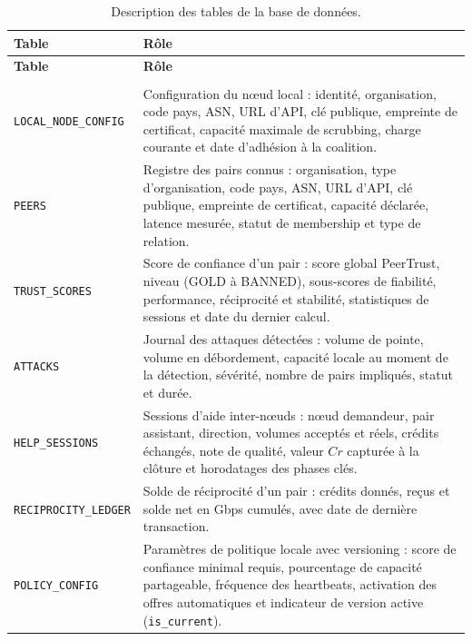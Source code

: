 \begin{longtable}{|
>{\raggedright\arraybackslash}p{5.2cm}|
>{\raggedright\arraybackslash}p{10.2cm}|}
\caption{Description des tables de la base de données.}
\label{tab:tables}
\\
\hline
\textbf{Table} & \textbf{Rôle} \\
\hline
\endfirsthead

\hline
\textbf{Table} & \textbf{Rôle} \\
\hline
\endhead

\hline
\multicolumn{2}{r}{\textit{Suite à la page suivante}} \\
\endfoot

\hline
\endlastfoot

\texttt{LOCAL\_NODE\_CONFIG} &
Configuration du nœud local : identité, organisation, code pays, ASN, URL d'API, clé publique, empreinte de certificat, capacité maximale de scrubbing, charge courante et date d'adhésion à la coalition. \\
\hline

\texttt{PEERS} &
Registre des pairs connus : organisation, type d'organisation, code pays, ASN, URL d'API, clé publique, empreinte de certificat, capacité déclarée, latence mesurée, statut de membership et type de relation. \\
\hline

\texttt{TRUST\_SCORES} &
Score de confiance d'un pair : score global PeerTrust, niveau (GOLD à BANNED), sous-scores de fiabilité, performance, réciprocité et stabilité, statistiques de sessions et date du dernier calcul. \\
\hline

\texttt{ATTACKS} &
Journal des attaques détectées : volume de pointe, volume en débordement, capacité locale au moment de la détection, sévérité, nombre de pairs impliqués, statut et durée. \\
\hline

\texttt{HELP\_SESSIONS} &
Sessions d'aide inter-nœuds : nœud demandeur, pair assistant, direction, volumes acceptés et réels, crédits échangés, note de qualité, valeur $Cr$ capturée à la clôture et horodatages des phases clés. \\
\hline

\texttt{RECIPROCITY\_LEDGER} &
Solde de réciprocité d'un pair : crédits donnés, reçus et solde net en Gbps cumulés, avec date de dernière transaction. \\
\hline

\texttt{POLICY\_CONFIG} &
Paramètres de politique locale avec versioning : score de confiance minimal requis, pourcentage de capacité partageable, fréquence des heartbeats, activation des offres automatiques et indicateur de version active (\texttt{is\_current}). \\
\hline


\end{longtable}

